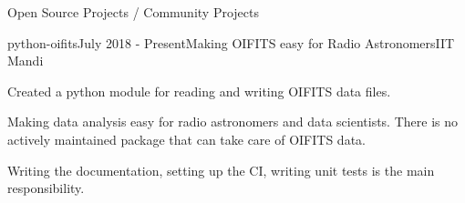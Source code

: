 \documentclass{resume} %
\begin{document}
\begin{rSection}{Open Source Projects / Community Projects}
 \begin{rSubsection}{python-oifits}{July 2018 - Present}{Making OIFITS easy for Radio Astronomers}{IIT Mandi}
\item Created a python module for reading and writing OIFITS data files.
\item Making data analysis easy for radio astronomers and data scientists.  There is no actively maintained package that can take care of OIFITS data. 
\item Writing the documentation, setting up the CI, writing unit tests is the main responsibility. 
 \end{rSubsection}
 
\end{rSection}

\end{document}
